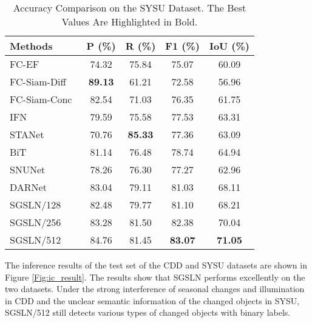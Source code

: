 \documentclass[journal]{IEEEtran}
\begin{document}
\begin{table}[!ht]
\caption{Accuracy Comparison on the SYSU Dataset. The Best Values Are Highlighted in Bold.}
\label{sysu_result}
\centering
\begin{tabular}{lcccc}
\toprule
Methods & P (\%) & R (\%) & F1 (\%) & IoU (\%) \\
\midrule
FC-EF~\cite{fcef} & 74.32 & 75.84 & 75.07 & 60.09 \\
FC-Siam-Diff~\cite{fcef} & \textbf{89.13} & 61.21 & 72.58 & 56.96 \\
FC-Siam-Conc~\cite{fcef} & 82.54 & 71.03 & 76.35 & 61.75 \\
IFN~\cite{dsifn} & 79.59 & 75.58 & 77.53 & 63.31 \\
STANet~\cite{sta} & 70.76 & \textbf{85.33} & 77.36 & 63.09 \\
BiT~\cite{bit} & 81.14 & 76.48 & 78.74 & 64.94 \\
SNUNet~\cite{snu} & 78.26 & 76.30 & 77.27 & 62.96 \\
DARNet~\cite{darn} & 83.04 & 79.11 & 81.03 & 68.11 \\
SGSLN/128 & 82.48 & 79.77 & 81.10 & 68.21 \\
SGSLN/256 & 83.28 & 81.50 & 82.38 & 70.04 \\
SGSLN/512 & 84.76 & 81.45 & \textbf{83.07} & \textbf{71.05} \\
\bottomrule
\end{tabular}
\end{table}

The inference results of the test set of the CDD and SYSU datasets are shown in Figure \ref{Fig:ic_result}. The results show that SGSLN performs excellently on the two datasets. Under the strong interference of seasonal changes and illumination in CDD and the unclear semantic information of the changed objects in SYSU, SGSLN/512 still detects various types of changed objects with binary labels. 
\end{document}
